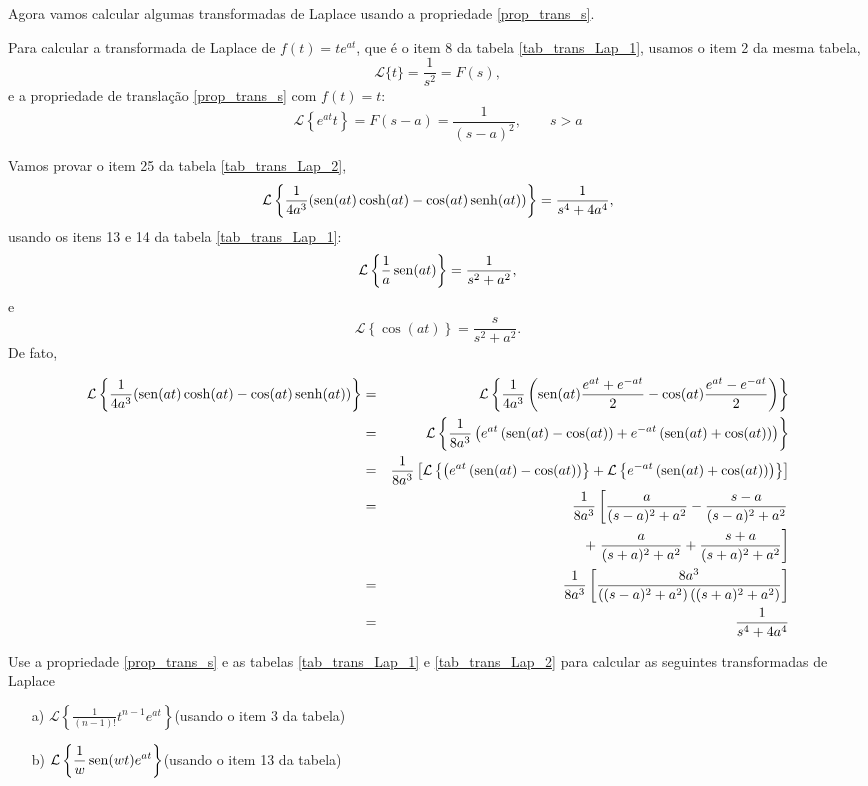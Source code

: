 \documentclass[Main.tex]{subfiles}
\begin{document}
Agora vamos calcular algumas transformadas de Laplace usando a propriedade \ref{prop_trans_s}.

\begin{ex}Para calcular a transformada de Laplace de $f(t)=te^{at}$, que é o item 8 da tabela \ref{tab_trans_Lap_1}, usamos o item 2 da mesma tabela,
$$
\mathcal{L}\{t\}=\frac{1}{s^2}=F(s),
$$
e a propriedade de translação \ref{prop_trans_s} com $f(t)=t$:
$$
\mathcal{L}\left\{e^{at}t\right\} =F(s-a)=\frac{1}{(s-a)^2},\qquad s>a
$$
\end{ex}
\begin{ex}Vamos provar o item 25 da tabela \ref{tab_trans_Lap_2},
$$
\mathcal{L}\left\{ \frac{1}{4a^3}(\operatorname{sen}(at)\cosh(at)-\cos(at)\operatorname{senh}(at))\right\}=\frac{1}{s^4+4a^4},
$$
usando os itens 13 e 14 da tabela \ref{tab_trans_Lap_1}:
$$
\mathcal{L}\left\{\frac{1}{a}\operatorname{sen}(at)\right\}=\frac{1}{s^2+a^2},
$$
e
$$
\mathcal{L}\left\{\cos(at)\right\}=\frac{s}{s^2+a^2}.
$$
De fato,
\begin{small}
\begin{eqnarray*}
\mathcal{L}\left\{ \frac{1}{4a^3}(\operatorname{sen}(at)\cosh(at)-\cos(at)\operatorname{senh}(at))\right\}&=&\mathcal{L}\left\{ \frac{1}{4a^3}\left(\operatorname{sen}(at)\frac{e^{at}+e^{-at}}{2}-\cos(at)\frac{e^{at}-e^{-at}}{2}\right)\right\}\\
&=&\mathcal{L}\left\{ \frac{1}{8a^3}\left(e^{at}\left( \operatorname{sen}(at)-\cos(at)\right)+e^{-at}\left(\operatorname{sen}(at)+\cos(at)\right)\right)\right\}\\
&=&\frac{1}{8a^3}\left[ \mathcal{L}\left\{ \left(e^{at}\left( \operatorname{sen}(at)-\cos(at)\right)\right\}+\mathcal{L}\left\{e^{-at}\left(\operatorname{sen}(at)+\cos(at)\right)\right)\right\}\right]\\
&=&\frac{1}{8a^3}\left[\frac{a}{(s-a)^2+a^2}-\frac{s-a}{(s-a)^2+a^2}\right.\\&&\hspace{40pt}+\left.\frac{a}{(s+a)^2+a^2}+\frac{s+a}{(s+a)^2+a^2}\right]\\
&=&\frac{1}{8a^3}\left[\frac{8a^3}{\left((s-a)^2+a^2\right)\left((s+a)^2+a^2\right)}\right]\\
&=&\frac{1}{s^4+4a^4}
\end{eqnarray*}
\end{small}
\end{ex}
\begin{prob}Use a propriedade \ref{prop_trans_s} e as tabelas \ref{tab_trans_Lap_1} e \ref{tab_trans_Lap_2} para calcular as seguintes transformadas de Laplace
\begin{itemize}
 \item[a)] $\displaystyle \mathcal{L}\left\{\frac{1}{(n-1)!}t^{n-1}e^{at}\right\}$\qquad (usando o item 3 da tabela)
 \item[b)] $\displaystyle \mathcal{L}\left\{\frac{1}{w}\operatorname{sen}(wt)e^{at}\right\}$\qquad (usando o item 13 da tabela)
\end{itemize}

\end{prob}
\end{document}

